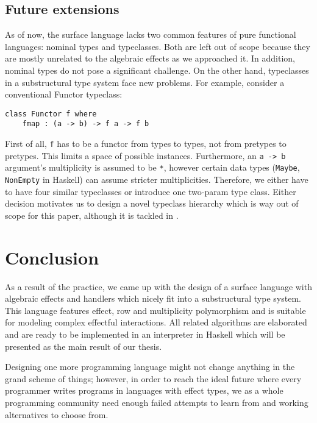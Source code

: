 \documentclass[a4paper,14pt]{extreport}
\begin{document}
\section{Future extensions}

As of now, the surface language lacks two common features of pure functional
languages: nominal types and typeclasses. Both are left out of scope because
they are mostly unrelated to the algebraic effects as we approached it. In
addition, nominal types do not pose a significant challenge. On the other hand,
typeclasses in a substructural type system face new problems. For example,
consider a conventional Functor typeclass:

\begin{verbatim}
class Functor f where
    fmap : (a -> b) -> f a -> f b
\end{verbatim}

First of all, \verb|f| has to be a functor from types to types, not from
pretypes to pretypes. This limits a space of possible instances. Furthermore, an
\verb|a -> b| argument's multiplicity is assumed to be \verb|*|, however certain
data types (\verb|Maybe|, \verb|NonEmpty| in Haskell) can assume stricter
multiplicities. Therefore, we either have to have four similar typeclasses or
introduce one two-param type class. Either decision motivates us to design a
novel typeclass hierarchy which is way out of scope for this paper, although it
is tackled in \cite{linear-base}.

\chapter{Conclusion}

As a result of the practice, we came up with the design of a surface language
with algebraic effects and handlers which nicely fit into a substructural type
system. This language features effect, row and multiplicity polymorphism and is
suitable for modeling complex effectful interactions. All related algorithms are
elaborated and are ready to be implemented in an interpreter in Haskell which
will be presented as the main result of our thesis.

Designing one more programming language might not change anything in the grand
scheme of things; however, in order to reach the ideal future where every
programmer writes programs in languages with effect types, we as a whole
programming community need enough failed attempts to learn from and working
alternatives to choose from.



\end{document}
